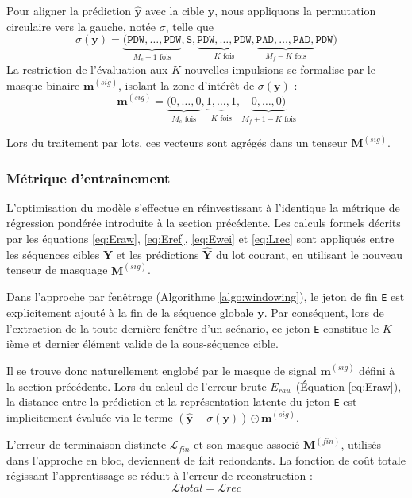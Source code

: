 Pour aligner la prédiction $\hat{\mathbf{y}}$ avec la cible $\mathbf{y}$, nous appliquons la permutation circulaire vers la gauche, notée $\sigma$, telle que 
$$\sigma(\mathbf{y}) =  \underbrace{(\texttt{PDW}, \dots, \texttt{PDW}}_{M_c - 1 \text{ fois}}, \texttt{S}, \underbrace{\texttt{PDW}, \dots, \texttt{PDW}}_{K \text{ fois}}, \underbrace{\texttt{PAD}, \dots, \texttt{PAD},}_{M_f - K \text{ fois}} \texttt{PDW})$$
La restriction de l'évaluation aux $K$ nouvelles impulsions se formalise par le masque binaire $\mathbf{m}^{(sig)}$, isolant la zone d'intérêt de $\sigma(\mathbf{y})$ :
\begin{equation}
\mathbf{m}^{(sig)} = \underbrace{(0, \dots, 0}_{M_c \text{ fois}}, \underbrace{1, \dots, 1}_{K \text{ fois}}, \underbrace{0, \dots, 0)}_{M_f + 1 - K \text{ fois}}
\end{equation}

Lors du traitement par lots, ces vecteurs sont agrégés dans un tenseur $\mathbf{M}^{(sig)}$. 

\subsubsection{Métrique d'entraînement}
L'optimisation du modèle s'effectue en réinvestissant à l'identique la métrique de régression pondérée introduite à la section précédente. Les calculs formels décrits par les équations \eqref{eq:Eraw}, \eqref{eq:Eref}, \eqref{eq:Ewei} et \eqref{eq:Lrec} sont appliqués entre les séquences cibles $\mathbf{Y}$ et les prédictions $\hat{\mathbf{Y}}$ du lot courant, en utilisant le nouveau tenseur de masquage $\mathbf{M}^{(sig)}$.

Dans l'approche par fenêtrage (Algorithme \ref{algo:windowing}), le jeton de fin \texttt{E} est explicitement ajouté à la fin de la séquence globale $\mathbf{y}$. Par conséquent, lors de l'extraction de la toute dernière fenêtre d'un scénario, ce jeton \texttt{E} constitue le $K$-ième et dernier élément valide de la sous-séquence cible.

Il se trouve donc naturellement englobé par le masque de signal $\mathbf{m}^{(sig)}$ défini à la section précédente. Lors du calcul de l'erreur brute $E_{raw}$ (Équation \eqref{eq:Eraw}), la distance entre la prédiction et la représentation latente du jeton \texttt{E} est implicitement évaluée via le terme $(\hat{\mathbf{y}} - \sigma(\mathbf{y})) \odot \mathbf{m}^{(sig)}$.

L'erreur de terminaison distincte $\mathcal{L}_{fin}$ et son masque associé $\mathbf{M}^{(fin)}$, utilisés dans l'approche en bloc, deviennent de fait redondants. La fonction de coût totale régissant l'apprentissage se réduit à l'erreur de reconstruction :\begin{equation}\mathcal{L}{total} = \mathcal{L}{rec}\end{equation}

